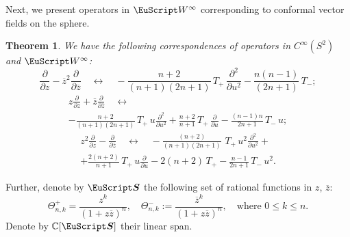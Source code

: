 \documentclass[]{amsart}
\newcounter{sec}
\newtheorem{theorem}{Theorem}[sec]
\renewcommand\O{\mathrm{O}}
\def\le{\leqslant}
\def\cS{\boldsymbol{\EuScript S}}
\def\cW{\EuScript W}
\def\R {{\mathbb R }}
\def\C {{\mathbb C }}
\def\ov{\overline}
\def\sm{\smallskip}
\begin{document}
  
Next, we present operators in $\cW^\infty$ corresponding
to conformal vector fields on the sphere.    

\begin{theorem}
\label{th:2}
We have the following correspondences of operators
in $C^\infty(S^2)$ and $\cW^\infty$:
\begin{equation}
\frac{\partial}{\partial z}- \ov z^2\frac{\partial}{\partial \ov z}
\quad\longleftrightarrow\quad 
-\frac{n + 2}{(n+1)(2 n+1)}\,
T_+ \,\frac{\partial^2}{\partial u^2}  - 
 \frac{n (n -  1)}{(2 n+1)}\, T_-  ;
\label{eq:conf1}
\end{equation}
\begin{multline}
z\frac{\partial}{\partial z}+ \ov z\frac{\partial}{\partial \ov z}
\quad\longleftrightarrow\quad 
\\ - \frac{n+2}{(n+1) (2 n+1)}\,
 T_+\, u \frac{\partial^2}{\partial u^2}+ 
 \frac{n+2}{n+1}\, T_+ \,  \frac{\partial}{\partial u}
 -\frac{(n-1) n}{2 n+1}\, T_- \,u ;
\label{eq:conf2}
\end{multline}
\begin{multline}
z^2\frac{\partial}{\partial z}- \frac{\partial}{\partial \ov z}
\quad\longleftrightarrow\quad 
-\frac{(n+2) }{(n+1) (2 n+1)}\,\, T_+ \, u^2\frac{\partial^2}{\partial u^2}
+\\+
\frac{2 (n+2)}{n+1}\, T_+ \,u  \frac{\partial}{\partial u}
-
2 (n+2)\, T_+
-\frac{n-1}{2 n+1} \,T_-\, u^2.
\label{eq:conf3}
\end{multline}
\end{theorem}

\medskip

Further, denote by $\cS$
the following set of rational functions in $z$, $\ov z$:
\begin{equation}
\Theta^+_{n,k}=\frac{z^k}{(1+z\ov z)^n},\quad \Theta^-_{n,k}:=\frac{\ov z^k}{(1+z\ov z)^n},
\quad\text{where $0\le k\le n$.}
\end{equation}
Denote by $\C[\cS]$ their linear span.

\sm
\end{document}
